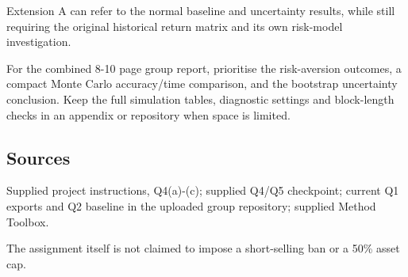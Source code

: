\documentclass[
  10pt,
  a4paper,
]{article}
\begin{document}
Extension A can refer to the normal baseline and uncertainty results,
while still requiring the original historical return matrix and its own
risk-model investigation.

For the combined 8-10 page group report, prioritise the risk-aversion
outcomes, a compact Monte Carlo accuracy/time comparison, and the
bootstrap uncertainty conclusion. Keep the full simulation tables,
diagnostic settings and block-length checks in an appendix or repository
when space is limited.

\hypertarget{sources}{%
\subsection{Sources}\label{sources}}

Supplied project instructions, Q4(a)-(c); supplied Q4/Q5 checkpoint;
current Q1 exports and Q2 baseline in the uploaded group repository;
supplied Method Toolbox.

The assignment itself is not claimed to impose a short-selling ban or a
50\% asset cap.
\end{document}
